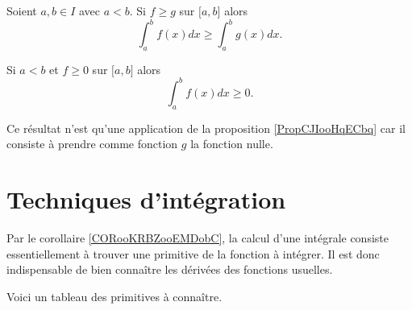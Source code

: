 \begin{proposition}   \label{PropCJIooHqECbq}
    Soient \( a,b\in I\) avec \( a<b\). Si \( f\geq g\) sur \( \mathopen[ a , b \mathclose]\) alors
    \begin{equation}
        \int_a^bf(x)dx\geq \int_a^bg(x)dx.
    \end{equation}
\end{proposition}

\begin{corollary}[Positivité] \label{PropHVWooBDRhCX}
    Si \( a<b\) et \( f\geq 0\) sur \( \mathopen[ a , b \mathclose]\) alors
    \begin{equation}
        \int_a^bf(x)dx\geq 0.
    \end{equation}
\end{corollary}

Ce résultat n'est qu'une application de la proposition \ref{PropCJIooHqECbq} car il consiste à prendre comme fonction $g$ la fonction nulle. 

\section{Techniques d'intégration}

Par le corollaire \ref{CORooKRBZooEMDobC}, la calcul d'une intégrale consiste essentiellement à trouver une primitive de la fonction à intégrer.  Il est donc indispensable de bien connaître les dérivées des fonctions usuelles.

Voici un tableau des primitives à connaître.

